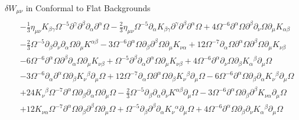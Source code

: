 \documentclass[8pt,aspectratio=1610]{beamer}
\begin{document}
\begin{frame}{$\delta W_{\mu\nu}$ in Conformal to Flat Backgrounds}
{\begin{align}
		\nonumber\\
		&-  \tfrac{1}{3} \eta_{\mu \nu} K_{\beta \gamma} \Omega^{-5} \partial^{\gamma}\partial^{\beta}\partial_{\alpha}\partial^{\alpha}\Omega -  \tfrac{2}{3} \eta_{\mu \nu} \Omega^{-5} \partial_{\alpha}K_{\beta \gamma} \partial^{\gamma}\partial^{\beta}\partial^{\alpha}\Omega + 4 \Omega^{-6} \partial^{\alpha}\Omega \partial^{\beta}\partial_{\nu}\Omega \partial_{\mu}K_{\alpha \beta} 
		\nonumber\\
		&-  \tfrac{2}{3} \Omega^{-5} \partial_{\beta}\partial_{\nu}\partial_{\alpha}\Omega \partial_{\mu}K^{\alpha \beta} - 3 \Omega^{-6} \partial^{\alpha}\Omega \partial_{\beta}\partial^{\beta}\Omega \partial_{\mu}K_{\nu \alpha} + 12 \Omega^{-7} \partial_{\alpha}\Omega \partial^{\alpha}\Omega \partial^{\beta}\Omega \partial_{\mu}K_{\nu \beta} 
		\nonumber\\
		&- 6 \Omega^{-6} \partial^{\alpha}\Omega \partial^{\beta}\partial_{\alpha}\Omega \partial_{\mu}K_{\nu \beta} + \Omega^{-5} \partial^{\beta}\partial_{\alpha}\partial^{\alpha}\Omega \partial_{\mu}K_{\nu \beta} + 4 \Omega^{-6} \partial^{\alpha}\partial_{\nu}\Omega \partial_{\beta}K_{\alpha}{}^{\beta} \partial_{\mu}\Omega 
		\nonumber\\
		&- 3 \Omega^{-6} \partial_{\alpha}\partial^{\alpha}\Omega \partial_{\beta}K_{\nu}{}^{\beta} \partial_{\mu}\Omega + 12 \Omega^{-7} \partial_{\alpha}\Omega \partial^{\alpha}\Omega \partial_{\beta}K_{\nu}{}^{\beta} \partial_{\mu}\Omega - 6 \Omega^{-6} \partial^{\alpha}\Omega \partial_{\beta}\partial_{\alpha}K_{\nu}{}^{\beta} \partial_{\mu}\Omega
		\nonumber\\
		& + 24 K_{\nu}{}^{\beta} \Omega^{-7} \partial^{\alpha}\Omega \partial_{\beta}\partial_{\alpha}\Omega \partial_{\mu}\Omega -  \tfrac{2}{3} \Omega^{-5} \partial_{\beta}\partial_{\alpha}\partial_{\nu}K^{\alpha \beta} \partial_{\mu}\Omega - 3 \Omega^{-6} \partial^{\alpha}\Omega \partial_{\beta}\partial^{\beta}K_{\nu \alpha} \partial_{\mu}\Omega 
		\nonumber\\
		&+ 12 K_{\nu \alpha} \Omega^{-7} \partial^{\alpha}\Omega \partial_{\beta}\partial^{\beta}\Omega \partial_{\mu}\Omega + \Omega^{-5} \partial_{\beta}\partial^{\beta}\partial_{\alpha}K_{\nu}{}^{\alpha} \partial_{\mu}\Omega + 4 \Omega^{-6} \partial^{\alpha}\Omega \partial_{\beta}\partial_{\nu}K_{\alpha}{}^{\beta} \partial_{\mu}\Omega 
		\nonumber
		\end{align}
	}
\end{frame}
\end{document}
